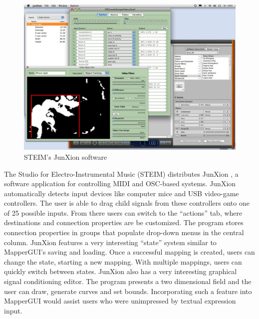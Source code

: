 \begin{figure}[h]
	\centering
		\includegraphics[width=\textwidth]{figures/junXion_v4}
		\caption{STEIM's JunXion software}
		\label{fig:junxion}
\end{figure}

The Studio for Electro-Instrumental Music (STEIM) distributes JunXion \cite{junxion}, a software application for controlling MIDI and OSC-based systems. JunXion automatically detects input devices like computer mice and USB video-game controllers. The user is able to drag child signals from these controllers onto one of 25 possible inputs.  From there users can switch to the ``actions'' tab, where destinations and connection properties are be customized. The program stores connection properties in groups that populate drop-down menus in the central column. JunXion features a very interesting ``state'' system similar to MapperGUI's saving and loading. Once a successful mapping is created, users can change the state, starting a new mapping. With multiple mappings, users can quickly switch between states. JunXion also has a very interesting graphical signal conditioning editor. The program presents a two dimensional field and the user can draw, generate curves and set bounds. Incorporating such a feature into MapperGUI would assist users who were unimpressed by textual expression input.

